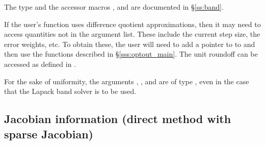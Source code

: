 {  The  type and the accessor macros ,  and
   are documented in \S\ref{ss:band}.

  If the user's  function uses difference quotient
  approximations, then it may need to access quantities not in the
  argument list. These include the current step size, the error weights, etc.
  To obtain these, the user will need to add a pointer to  
  to  and then use the  functions described in
  \S\ref{sss:optout_main}. The unit roundoff can be accessed as
   defined in .

  For the sake of uniformity, the arguments , , and  are
  of type , even in the case that the Lapack band solver is to be used.
}

\subsection{Jacobian information (direct method with sparse Jacobian)}
\label{ss:sjacFn}

